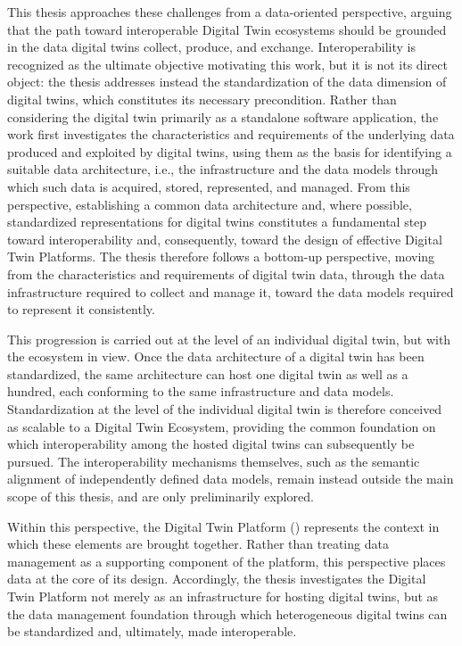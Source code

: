 This thesis approaches these challenges from a data-oriented perspective, arguing that the path toward interoperable Digital Twin ecosystems should be grounded in the data digital twins collect, produce, and exchange.
%
Interoperability is recognized as the ultimate objective motivating this work, but it is not its direct object: the thesis addresses instead the standardization of the data dimension of digital twins, which constitutes its necessary precondition.
%
Rather than considering the digital twin primarily as a standalone software application, the work first investigates the characteristics and requirements of the underlying data produced and exploited by digital twins, using them as the basis for identifying a suitable data architecture, i.e., the infrastructure and the data models through which such data is acquired, stored, represented, and managed.
%
From this perspective, establishing a common data architecture and, where possible, standardized representations for digital twins constitutes a fundamental step toward interoperability and, consequently, toward the design of effective Digital Twin Platforms.
%
The thesis therefore follows a bottom-up perspective, moving from the characteristics and requirements of digital twin data, through the data infrastructure required to collect and manage it, toward the data models required to represent it consistently.

This progression is carried out at the level of an individual digital twin, but with the ecosystem in view.
%
Once the data architecture of a digital twin has been standardized, the same architecture can host one digital twin as well as a hundred, each conforming to the same infrastructure and data models.
%
Standardization at the level of the individual digital twin is therefore conceived as scalable to a Digital Twin Ecosystem, providing the common foundation on which interoperability among the hosted digital twins can subsequently be pursued.
%
The interoperability mechanisms themselves, such as the semantic alignment of independently defined data models, remain instead outside the main scope of this thesis, and are only preliminarily explored.

Within this perspective, the Digital Twin Platform () represents the context in which these elements are brought together.
%
Rather than treating data management as a supporting component of the platform, this perspective places data at the core of its design.
%
Accordingly, the thesis investigates the Digital Twin Platform not merely as an infrastructure for hosting digital twins, but as the data management foundation through which heterogeneous digital twins can be standardized and, ultimately, made interoperable.

